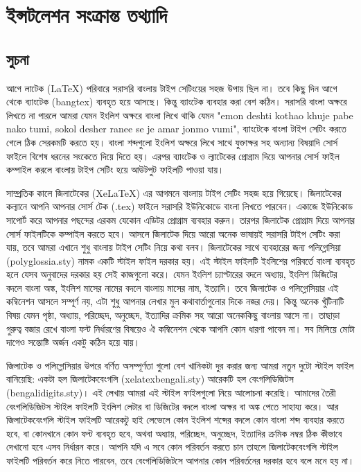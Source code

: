 \chapter{ইন্সটলেশন সংক্রান্ত তথ্যাদি}

\section{সুচনা}

আগে লাটেক (LaTeX) পরিবারে সরাসরি বাংলায় টাইপ সেটিংয়ের সহজ উপায় ছিল না। তবে কিছু দিন আগে থেকে ব্যাংটেক (bangtex) ব্যবহৃত হয়ে আসছে। কিন্তু ব্যাংটেক ব্যবহার করা বেশ কঠিন। সরাসরি বাংলা অক্ষরে লিখতে না পারলে আমরা যেমন ইংলিশ অক্ষরে বাংলা লিখে থাকি যেমন "emon deshti kothao khuje pabe nako tumi, sokol desher ranee se je amar jonmo vumi", ব্যাংটেকে বাংলা টাইপ সেটিং করতে গেলে ঠিক সেরকমটি করতে হয়। বাংলা শব্দগুলো ইংলিশ অক্ষরে লিখে সাথে যুক্তাক্ষর সহ অন্যান্য বিষয়াদি সোর্স ফাইলে বিশেষ ধরনের সংকেতে দিয়ে দিতে হয়। এরপর ব্যাংটেক ও ল্যাটেকের প্রোগ্রাম দিয়ে আপনার সোর্স ফাইল কম্পাইল করলে বাংলায় টাইপ সেটিং হয়ে আউটপুট ফাইলটি পাওয়া যায়। 

সাম্প্রতিক কালে জিলাটেকের (XeLaTeX) এর আগমনে বাংলায় টাইপ সেটিং সহজ হয়ে গিয়েছে। জিলাটেকের কল্যানে আপনি আপনার সোর্স টেক (.tex) ফাইলে সরাসরি ইউনিকোডে বাংলা লিখতে পারবেন। একাজে ইউনিকোড সাপোর্ট করে আপনার পছন্দের এরকম যেকোন এডিটর প্রোগ্রাম ব্যবহার করুন। তারপর জিলাটেক প্রোগ্রাম দিয়ে আপনার সোর্স ফাইলটিকে কম্পাইল করতে হবে। আসলে জিলাটেক দিয়ে আরো অনেক ভাষায়ই সরাসরি টাইপ সেটিং করা যায়, তবে আমরা এখানে শুধু বাংলায় টাইপ সেটিং নিয়ে কথা বলব। জিলাটেকের সাথে ব্যবহারের জন্য পলিগ্লোসিয়া (polyglossia.sty) নামক একটি স্টাইল ফাইল দরকার হয়। এই স্টাইল ফাইলটি ইংলিশের পরিবর্তে বাংলা ব্যবহৃত হলে যেসব অনুবাদের দরকার হয় সেই কাজগুলো করে। যেমন ইংলিশ চ্যাপ্টারের বদলে অধ্যায়, ইংলিশ ডিজিটের বদলে বাংলা অঙ্ক, ইংলিশ মাসের নামের বদলে বাংলায় মাসের নাম, ইত্যাদি। তবে জিলাটেক ও পলিগ্লোসিয়ার এই কম্বিনেশন আসলে সম্পূর্ণ নয়, এটা শুধু আপনার লেখার মুল কথাবার্তাগুলোর দিকে নজর দেয়। কিন্তু অনেক খুঁটিনাটি বিষয় যেমন পৃষ্ঠা, অধ্যায়, পরিচ্ছেদ, অনুচ্ছেদ, ইত্যাদির ক্রমিক সহ আরো অনেককিছু বাংলায় আসে না। তাছাড়া গুরুত্ব বজার রেখে বাংলা ফন্ট নির্ধারণের বিষয়েও ঐ কম্বিনেশন থেকে আপনি কোন ধারণা পাবেন না। সব মিলিয়ে মোটা দাগেও সন্তোষ্টি অর্জন একটু কঠিন হয়ে যায়।  

জিলাটেক ও পলিগ্লোসিয়ার উপরে বর্ণিত অসম্পূর্ণতা গুলো বেশ খানিকটা দুর করার জন্য আমরা নতুন দুটো স্টাইল ফাইল বানিয়েছি: একটা হল জিলাটেকবেংগলি (xelatexbengali.sty) আরেকটি হল বেংগলিডিজিটস (bengalidigits.sty)। এই লেখায় আমরা এই স্টাইল ফাইলগুলো নিয়ে আলোচনা করেছি। আমাদের তৈরী বেংগলিডিজিটস স্টাইল ফাইলটি ইংলিশ লেটার বা ডিজিটের বদলে বাংলা অক্ষর বা অঙ্ক পেতে সাহায্য করে। আর জিলাটেকবেংগলি স্টাইল ফাইলটি আরেকটু হাই লেভেলে কোন ইংলিশ শব্দের বদলে কোন বাংলা শব্দ ব্যবহার করতে হবে, বা কোনখানে কোন ফন্ট ব্যবহৃত হবে, অথবা অধ্যায়, পরিচ্ছেদ, অনুচ্ছেদ, ইত্যাদির ক্রমিক নম্বর ঠিক কীভাবে দেখানো হবে এসব নির্ধারন করে। আপনি যদি এ সবে কোন পরিবর্তন করতে চান তাহলে জিলাটেকবেংগলি স্টাইল ফাইলটি পরিবর্তন করে নিতে পারবেন, তবে বেংগলিডিজিটসে আপনার কোন পরিবর্তনের দরকার হবে বলে মনে হয় না।  

